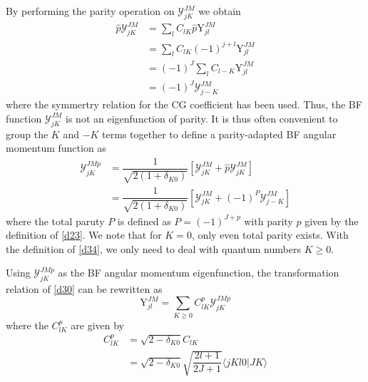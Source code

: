 \documentclass[]{article}
\begin{document}
By performing the parity operation on $\mathcal{Y}^{JM}_{jK}$ we obtain
\begin{align}
	\hat{p}\mathcal{Y}^{JM}_{jK}&=\sum\limits_lC_{lK}\hat{p}\mathrm{Y}^{JM}_{jl}\nonumber\\
	&=\sum\limits_lC_{lK}(-1)^{j+l}\mathrm{Y}^{JM}_{jl}\nonumber\\
	&=(-1)^J\sum\limits_lC_{l-K}\mathrm{Y}^{JM}_{jl}\nonumber\\
	&=(-1)^J\mathcal{Y}^{JM}_{j-K}
\end{align}
where the symmertry relation for the CG coefficient has been used. Thus, the BF function $\mathcal{Y}^{JM}_{jK}$ is not an eigenfunction of parity. It is thus often convenient to group the $K$ and $-K$ terms together to define a parity-adapted BF angular momentum function as
\begin{align}
	\mathcal{Y}^{JMp}_{jK}&=\dfrac{1}{\sqrt{2(1+\delta_{K0})}}[\mathcal{Y}^{JM}_{jK}+\hat{p}\mathcal{Y}^{JM}_{jK}]\nonumber\\
	&=\dfrac{1}{\sqrt{2(1+\delta_{K0})}}[\mathcal{Y}^{JM}_{jK}+(-1)^P\mathcal{Y}^{JM}_{j-K}]
	\label{d34}
\end{align}
where the total paruty $P$ is defined as $P=(-1)^{J+p}$ with parity $p$ given by the definition of \eqref{d23}. We note that for $K=0$, only even total parity exists. With the definition of \eqref{d34}, we only need to deal with quantum numbers $K\geqslant0$.

Using $\mathcal{Y}^{JMp}_{jK}$ as the BF angular momentum eigenfunction, the transformation relation of \eqref{d30} can be rewritten as
\begin{equation}
	\mathrm{Y}^{JM}_{jl}=\sum\limits_{K\geqslant0}C^p_{lK}\mathcal{Y}^{JMp}_{jK}
\end{equation}
where the $C^p_{lK}$ are given by
\begin{align}
	C^p_{lK}&=\sqrt{2-\delta_{K0}}C_{lK}\nonumber\\
	&=\sqrt{2-\delta_{K0}}\sqrt{\dfrac{2l+1}{2J+1}}\langle jKl0|JK\rangle
\end{align}
\end{document}

